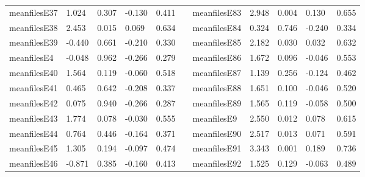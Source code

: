 \begin{table}[h!]
\begin{tabular}{lllllllllll}
meanfilesE37  & 1.024            & 0.307            & -0.130              & 0.411               &           & meanfilesE83  & 2.948            & 0.004            & 0.130               & 0.655               \\
meanfilesE38  & 2.453            & 0.015            & 0.069               & 0.634               &           & meanfilesE84  & 0.324            & 0.746            & -0.240              & 0.334               \\
meanfilesE39  & -0.440           & 0.661            & -0.210              & 0.330               &           & meanfilesE85  & 2.182            & 0.030            & 0.032               & 0.632               \\
meanfilesE4   & -0.048           & 0.962            & -0.266              & 0.279               &           & meanfilesE86  & 1.672            & 0.096            & -0.046              & 0.553               \\
meanfilesE40  & 1.564            & 0.119            & -0.060              & 0.518               &           & meanfilesE87  & 1.139            & 0.256            & -0.124              & 0.462               \\
meanfilesE41  & 0.465            & 0.642            & -0.208              & 0.337               &           & meanfilesE88  & 1.651            & 0.100            & -0.046              & 0.520               \\
meanfilesE42  & 0.075            & 0.940            & -0.266              & 0.287               &           & meanfilesE89  & 1.565            & 0.119            & -0.058              & 0.500               \\
meanfilesE43  & 1.774            & 0.078            & -0.030              & 0.555               &           & meanfilesE9   & 2.550            & 0.012            & 0.078               & 0.615               \\
meanfilesE44  & 0.764            & 0.446            & -0.164              & 0.371               &           & meanfilesE90  & 2.517            & 0.013            & 0.071               & 0.591               \\
meanfilesE45  & 1.305            & 0.194            & -0.097              & 0.474               &           & meanfilesE91  & 3.343            & 0.001            & 0.189               & 0.736               \\
meanfilesE46  & -0.871           & 0.385            & -0.160              & 0.413               &           & meanfilesE92  & 1.525            & 0.129            & -0.063              & 0.489               \\

\end{tabular}
\end{table}
